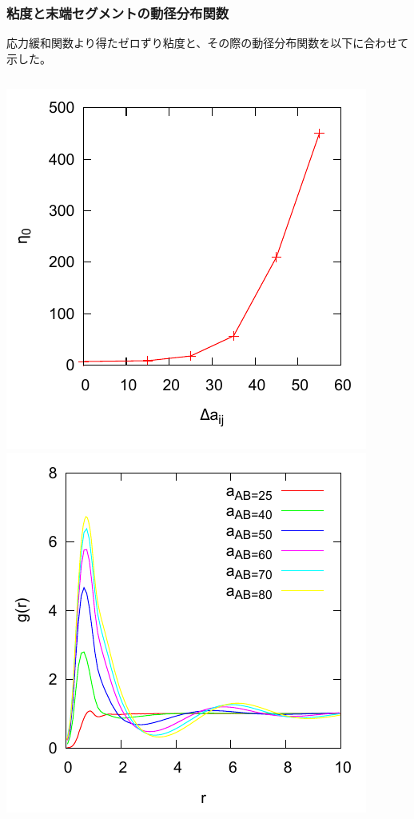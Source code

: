 \documentclass[12pt, dvipdfmx]{beamer}
\begin{document}
\begin{frame}
\frametitle{粘度と末端セグメントの動径分布関数}
応力緩和関数より得たゼロずり粘度と、その際の動径分布関数を以下に合わせて示した。


	\begin{columns}[T, totalwidth=0.96\linewidth]
		\includegraphics[width=\columnwidth]{./fig/0_nendo.pdf}
		\includegraphics[width=\columnwidth]{./fig/gr_all.pdf}
	\end{columns}
\end{frame}
\end{document}
